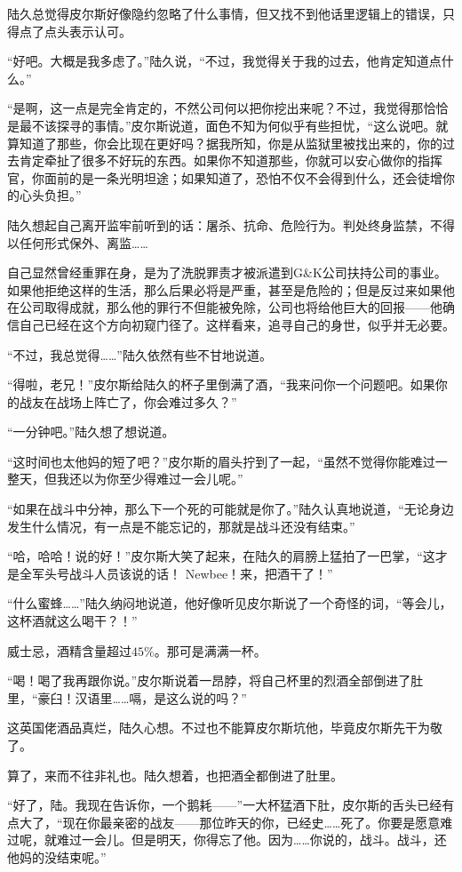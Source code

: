 陆久总觉得皮尔斯好像隐约忽略了什么事情，但又找不到他话里逻辑上的错误，只得点了点头表示认可。

“好吧。大概是我多虑了。”陆久说，“不过，我觉得关于我的过去，他肯定知道点什么。”

“是啊，这一点是完全肯定的，不然公司何以把你挖出来呢？不过，我觉得那恰恰是最不该探寻的事情。”皮尔斯说道，面色不知为何似乎有些担忧，“这么说吧。就算知道了那些，你会比现在更好吗？据我所知，你是从监狱里被找出来的，你的过去肯定牵扯了很多不好玩的东西。如果你不知道那些，你就可以安心做你的指挥官，你面前的是一条光明坦途；如果知道了，恐怕不仅不会得到什么，还会徒增你的心头负担。”

陆久想起自己离开监牢前听到的话：屠杀、抗命、危险行为。判处终身监禁，不得以任何形式保外、离监……

自己显然曾经重罪在身，是为了洗脱罪责才被派遣到G\&K公司扶持公司的事业。如果他拒绝这样的生活，那么后果必将是严重，甚至是危险的；但是反过来如果他在公司取得成就，那么他的罪行不但能被免除，公司也将给他巨大的回报——他确信自己已经在这个方向初窥门径了。这样看来，追寻自己的身世，似乎并无必要。

“不过，我总觉得……”陆久依然有些不甘地说道。

“得啦，老兄！”皮尔斯给陆久的杯子里倒满了酒，“我来问你一个问题吧。如果你的战友在战场上阵亡了，你会难过多久？”

“一分钟吧。”陆久想了想说道。

“这时间也太他妈的短了吧？”皮尔斯的眉头拧到了一起，“虽然不觉得你能难过一整天，但我还以为你至少得难过一会儿呢。” 

“如果在战斗中分神，那么下一个死的可能就是你了。”陆久认真地说道，“无论身边发生什么情况，有一点是不能忘记的，那就是战斗还没有结束。”

“哈，哈哈！说的好！”皮尔斯大笑了起来，在陆久的肩膀上猛拍了一巴掌，“这才是全军头号战斗人员该说的话！ Newbee！来，把酒干了！”

“什么蜜蜂……”陆久纳闷地说道，他好像听见皮尔斯说了一个奇怪的词，“等会儿，这杯酒就这么喝干？！”

威士忌，酒精含量超过$45\%$。那可是满满一杯。

“喝！喝了我再跟你说。”皮尔斯说着一昂脖，将自己杯里的烈酒全部倒进了肚里，“豪臼！汉语里……嗝，是这么说的吗？”

这英国佬酒品真烂，陆久心想。不过也不能算皮尔斯坑他，毕竟皮尔斯先干为敬了。

算了，来而不往非礼也。陆久想着，也把酒全都倒进了肚里。

“好了，陆。我现在告诉你，一个鹅耗——”一大杯猛酒下肚，皮尔斯的舌头已经有点大了，“现在你最亲密的战友——那位昨天的你，已经史……死了。你要是愿意难过呢，就难过一会儿。但是明天，你得忘了他。因为……你说的，战斗。战斗，还他妈的没结束呢。”

